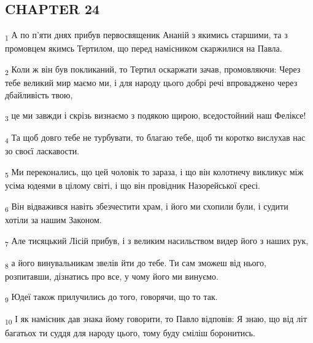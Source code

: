 \subsection{CHAPTER 24}
\begin{tcolorbox}
\textsubscript{1} А по п'яти днях прибув первосвященик Ананій з якимись старшими, та з промовцем якимсь Тертилом, що перед намісником скаржилися на Павла.
\end{tcolorbox}
\begin{tcolorbox}
\textsubscript{2} Коли ж він був покликаний, то Тертил оскаржати зачав, промовляючи: Через тебе великий мир маємо ми, і для народу цього добрі речі впроваджено через дбайливість твою,
\end{tcolorbox}
\begin{tcolorbox}
\textsubscript{3} це ми завжди і скрізь визнаємо з подякою щирою, вседостойний наш Феліксе!
\end{tcolorbox}
\begin{tcolorbox}
\textsubscript{4} Та щоб довго тебе не турбувати, то благаю тебе, щоб ти коротко вислухав нас зо своєї ласкавости.
\end{tcolorbox}
\begin{tcolorbox}
\textsubscript{5} Ми переконались, що цей чоловік то зараза, і що він колотнечу викликує між усіма юдеями в цілому світі, і що він провідник Назорейської єресі.
\end{tcolorbox}
\begin{tcolorbox}
\textsubscript{6} Він відважився навіть збезчестити храм, і його ми схопили були, і судити хотіли за нашим Законом.
\end{tcolorbox}
\begin{tcolorbox}
\textsubscript{7} Але тисяцький Лісій прибув, і з великим насильством видер його з наших рук,
\end{tcolorbox}
\begin{tcolorbox}
\textsubscript{8} а його винувальникам звелів йти до тебе. Ти сам зможеш від нього, розпитавши, дізнатись про все, у чому його ми винуємо.
\end{tcolorbox}
\begin{tcolorbox}
\textsubscript{9} Юдеї також прилучились до того, говорячи, що то так.
\end{tcolorbox}
\begin{tcolorbox}
\textsubscript{10} І як намісник дав знака йому говорити, то Павло відповів: Я знаю, що від літ багатьох ти суддя для народу цього, тому буду сміліш боронитись.
\end{tcolorbox}
